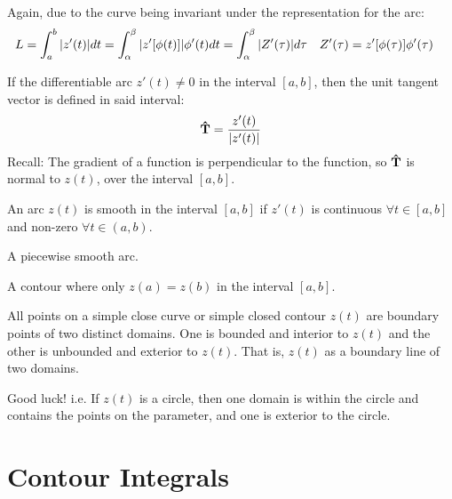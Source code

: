 \documentclass[12pt, english]{book}
\makeatletter
\renewenvironment{proof}[1][\proofname]{\par
	\pushQED{\qed}%
	\normalfont \topsep6\p@\@plus6\p@\relax
	\list{}{%
		\settowidth{\leftmargin}{\itshape\proofname:\hskip\labelsep}%
		\setlength{\labelwidth}{0pt}%
		\setlength{\itemindent}{-\leftmargin}%
	}%
	\item[\hskip\labelsep\itshape#1\@addpunct{:}]\ignorespaces
}{%
	\popQED\endlist\@endpefalse
}
\makeatother
\begin{document}
	Again, due to the curve being invariant under the representation for the arc:
	\begin{align*}
		L &= \int_{a}^{b} \abs{z'(t)} dt = \int_{\alpha}^{\beta} \abs{z'[\phi(t)]} \phi'(t) dt = \int_{\alpha}^{\beta} \abs{Z'(\tau)} d\tau 
			& Z'(\tau) &= z'[\phi(\tau)] \phi'(\tau)
	\end{align*} 

	If the differentiable arc \(z'(t) \neq 0\) in the interval \([a,b]\), then the unit tangent vector is defined in said interval: 
	\begin{align*}
		\vu{T} = \frac{z'(t)}{\abs{z'(t)}}
	\end{align*}
	Recall: The gradient of a function is perpendicular to the function, so \(\vu{T}\) is  normal to \(z(t)\), over the interval \([a,b]\).
	
	\begin{definition}[Smooth]
		\label{Smooth Definition - Complex}
		An arc \(z(t)\) is smooth in the interval \([a,b]\) if \(z'(t)\) is continuous \(\forall t \in [a,b]\) and non-zero \(\forall t \in (a,b)\).
	\end{definition}
	
	\begin{definition}[Contour]
		\label{Contour Definition - Complex}
		A piecewise smooth arc.
	\end{definition}

	\begin{definition}
		\label{Simple Closed Contour Definition - Complex}
		A contour where only \(z(a) = z(b)\) in the interval \([a,b]\).
	\end{definition}
	
	\begin{theorem}
		\label{Jordan Curve Theorem - Complex}
		All points on a simple close curve or simple closed contour \(z(t)\) are boundary points of two distinct domains. One is bounded and interior to \(z(t)\) and the other is unbounded and exterior to \(z(t)\).  That is, \(z(t)\) as a boundary line of two domains. 
	\end{theorem}
	\begin{proof}
		Good luck!
	\end{proof}
	i.e. If \(z(t)\) is a circle, then one domain is within the circle and contains the points on the parameter, and one is exterior to the circle.
	
	\section{Contour Integrals} \label{Contour Integrals Section - Complex}
	
\end{document}
